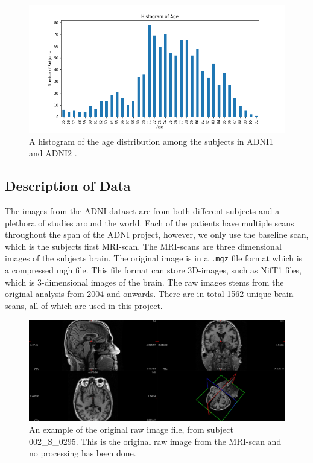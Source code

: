 \documentclass[12pt, fleqn, titlepage]{article}
\newcommand{\1}[1]{\mathds{1}\left[#1\right]}
\begin{document}
\begin{figure}[H]
	\centering
	\includegraphics[width=0.9\linewidth]{imgs/age_distro}
	\caption{A histogram of the age distribution among the subjects in ADNI1 and ADNI2 \cite{adni,adni1}.}
	\label{fig:age}
\end{figure}


\subsection{Description of Data} \label{dataDescription}


The images from the ADNI dataset are from both different subjects and a plethora of studies around the world.
Each of the patients have multiple scans throughout the span of the ADNI project, however, we only use the baseline scan, which is the subjects first MRI-scan. 
The MRI-scans are three dimensional images of the subjects brain. 
The original image is in a \texttt{.mgz} file format which is a compressed mgh file. 
This file format can store 3D-images, such as NifT1 files, which is 3-dimensional images of the brain. 
The raw images stems from the original analysis from 2004 and onwards. There are in total 1562 %
unique brain scans, all of which are used in this project.

\begin{figure}[H]
	\centering
	\includegraphics[width=0.95\linewidth]{mymans2}
	\caption{An example of the original raw image file, from subject 002\_S\_0295. This is the original raw image from the MRI-scan and no processing has been done.}
	\label{fig:screenshot001}
\end{figure}
\end{document}
